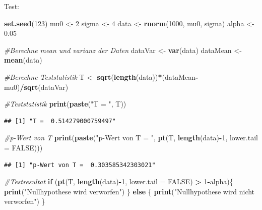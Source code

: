 \documentclass[]{article}
\newenvironment{Shaded}{\begin{snugshade}}{\end{snugshade}}
\newcommand{\CommentTok}[1]{\textcolor[rgb]{0.56,0.35,0.01}{\textit{#1}}}
\newcommand{\ControlFlowTok}[1]{\textcolor[rgb]{0.13,0.29,0.53}{\textbf{#1}}}
\newcommand{\DataTypeTok}[1]{\textcolor[rgb]{0.13,0.29,0.53}{#1}}
\newcommand{\DecValTok}[1]{\textcolor[rgb]{0.00,0.00,0.81}{#1}}
\newcommand{\FloatTok}[1]{\textcolor[rgb]{0.00,0.00,0.81}{#1}}
\newcommand{\KeywordTok}[1]{\textcolor[rgb]{0.13,0.29,0.53}{\textbf{#1}}}
\newcommand{\NormalTok}[1]{#1}
\newcommand{\OperatorTok}[1]{\textcolor[rgb]{0.81,0.36,0.00}{\textbf{#1}}}
\newcommand{\OtherTok}[1]{\textcolor[rgb]{0.56,0.35,0.01}{#1}}
\newcommand{\StringTok}[1]{\textcolor[rgb]{0.31,0.60,0.02}{#1}}
\begin{document}
Test:

\begin{Shaded}
\begin{Highlighting}[]
\KeywordTok{set.seed}\NormalTok{(}\DecValTok{123}\NormalTok{)}
\NormalTok{mu0 <-}\StringTok{ }\DecValTok{2}
\NormalTok{sigma <-}\StringTok{ }\DecValTok{4}
\NormalTok{data <-}\StringTok{ }\KeywordTok{rnorm}\NormalTok{(}\DecValTok{1000}\NormalTok{, mu0, sigma)}
\NormalTok{alpha <-}\StringTok{ }\FloatTok{0.05}

\CommentTok{#Berechne mean und varianz der Daten}
\NormalTok{dataVar <-}\StringTok{ }\KeywordTok{var}\NormalTok{(data)}
\NormalTok{dataMean <-}\StringTok{ }\KeywordTok{mean}\NormalTok{(data)}

\CommentTok{#Berechne Teststatistik}
\NormalTok{T <-}\StringTok{ }\KeywordTok{sqrt}\NormalTok{(}\KeywordTok{length}\NormalTok{(data))}\OperatorTok{*}\NormalTok{(dataMean}\OperatorTok{-}\NormalTok{mu0)}\OperatorTok{/}\KeywordTok{sqrt}\NormalTok{(dataVar)}

\CommentTok{#Teststatistik}
\KeywordTok{print}\NormalTok{(}\KeywordTok{paste}\NormalTok{(}\StringTok{"T = "}\NormalTok{, T))}
\end{Highlighting}
\end{Shaded}

\begin{verbatim}
## [1] "T =  0.514279000759497"
\end{verbatim}

\begin{Shaded}
\begin{Highlighting}[]
\CommentTok{#p-Wert von T}
\KeywordTok{print}\NormalTok{(}\KeywordTok{paste}\NormalTok{(}\StringTok{"p-Wert von T = "}\NormalTok{, }\KeywordTok{pt}\NormalTok{(T, }\KeywordTok{length}\NormalTok{(data)}\OperatorTok{-}\DecValTok{1}\NormalTok{, }\DataTypeTok{lower.tail =} \OtherTok{FALSE}\NormalTok{)))}
\end{Highlighting}
\end{Shaded}

\begin{verbatim}
## [1] "p-Wert von T =  0.303585342303021"
\end{verbatim}

\begin{Shaded}
\begin{Highlighting}[]
\CommentTok{#Testresultat}
\ControlFlowTok{if}\NormalTok{ (}\KeywordTok{pt}\NormalTok{(T, }\KeywordTok{length}\NormalTok{(data)}\OperatorTok{-}\DecValTok{1}\NormalTok{, }\DataTypeTok{lower.tail =} \OtherTok{FALSE}\NormalTok{) }\OperatorTok{>}\StringTok{ }\DecValTok{1}\OperatorTok{-}\NormalTok{alpha)\{}
  \KeywordTok{print}\NormalTok{(}\StringTok{"Nullhypothese wird verworfen"}\NormalTok{)}
\NormalTok{\} }\ControlFlowTok{else}\NormalTok{ \{}
  \KeywordTok{print}\NormalTok{(}\StringTok{"Nullhypothese wird nicht verworfen"}\NormalTok{)}
\NormalTok{\}}
\end{Highlighting}
\end{Shaded}
\end{document}
